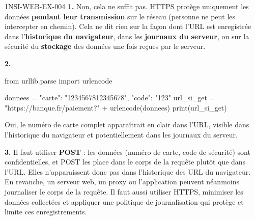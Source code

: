 \begin{corrige}{1NSI-WEB-EX-004}
\textbf{1.} Non, cela ne suffit pas. HTTPS protège uniquement les données \textbf{pendant
leur transmission} sur le réseau (personne ne peut les intercepter en chemin). Cela ne dit
rien sur la façon dont l'URL est enregistrée dans l'\textbf{historique du navigateur}, dans
les \textbf{journaux du serveur}, ou sur la sécurité du \textbf{stockage} des données une
fois reçues par le serveur.

\textbf{2.}
\begin{python}
from urllib.parse import urlencode

donnees = {"carte": "1234567812345678", "code": "123"}
url_si_get = "https://banque.fr/paiement?" + urlencode(donnees)
print(url_si_get)
\end{python}
Oui, le numéro de carte complet apparaîtrait en clair dans l'URL, visible dans
l'historique du navigateur et potentiellement dans les journaux du serveur.

\textbf{3.} Il faut utiliser \textbf{POST} : les données (numéro de carte, code de
sécurité) sont confidentielles, et POST les place dans le corps de la requête plutôt que
dans l'URL. Elles n'apparaissent donc pas dans l'historique des URL du navigateur. En
revanche, un serveur web, un proxy ou l'application peuvent néanmoins journaliser le corps
de la requête. Il faut aussi utiliser HTTPS, minimiser les données collectées et appliquer
une politique de journalisation qui protège et limite ces enregistrements.
\end{corrige}

